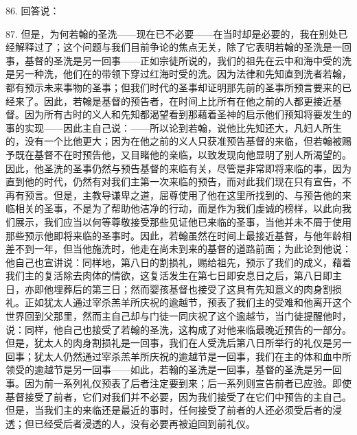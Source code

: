 86. 回答说：\par

87. 但是，为何若翰的圣洗——现在已不必要——在当时却是必要的，我在别处已经解释过了；这个问题与我们目前争论的焦点无关，除了它表明若翰的圣洗是一回事，基督的圣洗是另一回事——正如宗徒所说的，我们的祖先在云中和海中受的洗是另一种洗，他们在的带领下穿过红海时受的洗。因为法律和先知直到洗者若翰，都有预示未来事物的圣事；但我们时代的圣事却证明那先前的圣事所预言要来的已经来了。因此，若翰是基督的预告者，在时间上比所有在他之前的人都更接近基督。因为所有古时的义人和先知都渴望看到那藉着圣神的启示他们预知将要发生的事的实现——因此主自己说：——所以论到若翰，说他比先知还大，凡妇人所生的，没有一个比他更大；因为在他之前的义人只获准预告基督的来临，但若翰被赐予既在基督不在时预告他，又目睹他的亲临，以致发现向他显明了别人所渴望的。因此，他圣洗的圣事仍然与预告基督的来临有关，尽管是非常即将来临的事，因为直到他的时代，仍然有对我们主第一次来临的预告，而对此我们现在只有宣告，不再有预言。但是，主教导谦卑之道，屈尊使用了他在这里所找到的、与预告他的来临相关的圣事，不是为了帮助他洁净的行动，而是作为我们虔诚的榜样，以此向我们展示，我们应当以何等尊敬接受那些见证他已来临的圣事，当他并未不屑于使用那些预示他即将来临的圣事时。因此，若翰虽然在时间上最接近基督，与他年龄相差不到一年，但当他施洗时，他走在尚未到来的基督的道路前面；为此论到他说：他自己也宣讲说：同样地，第八日的割损礼，赐给祖先，预示了我们的成义，藉着我们主的复活除去肉体的情欲，这复活发生在第七日即安息日之后，第八日即主日，亦即他埋葬后的第三日；然而婴孩基督也接受了这具有先知意义的肉身割损礼。正如犹太人通过宰杀羔羊所庆祝的逾越节，预表了我们主的受难和他离开这个世界回到父那里，然而主自己却与门徒一同庆祝了这个逾越节，当门徒提醒他时，说：同样，他自己也接受了若翰的圣洗，这构成了对他来临最晚近预告的一部分。但是，犹太人的肉身割损礼是一回事，我们在人受洗后第八日所举行的礼仪是另一回事；犹太人仍然通过宰杀羔羊所庆祝的逾越节是一回事，我们在主的体和血中所领受的逾越节是另一回事——如此，若翰的圣洗是一回事，基督的圣洗是另一回事。因为前一系列礼仪预表了后者注定要到来；后一系列则宣告前者已应验。即使基督接受了前者，它们对我们并不必要，因为我们接受了在它们中预告的主自己。但是，当我们主的来临还是最近的事时，任何接受了前者的人还必须受后者的浸透；但已经受后者浸透的人，没有必要再被迫回到前礼仪。\par

